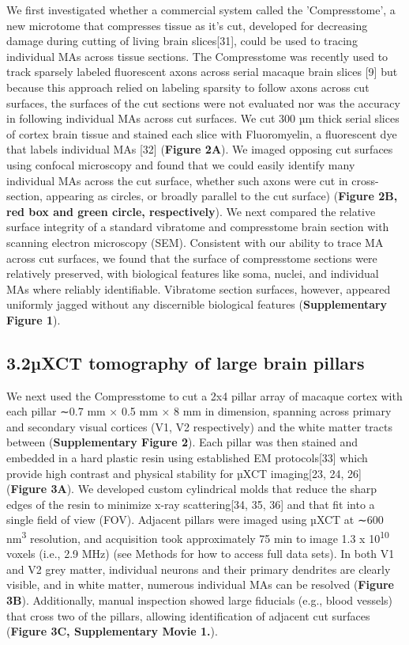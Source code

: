 \documentclass{article}
\begin{document}
We first investigated whether a commercial system called the ’Compresstome’, a new microtome that compresses tissue as it’s cut, developed for decreasing damage during cutting of living brain slices[31], could be used to tracing individual MAs across tissue sections. The Compresstome was recently used to track sparsely labeled fluorescent axons across serial macaque brain slices [9] but because this approach relied on labeling sparsity to follow axons across cut surfaces, the surfaces of the cut sections were not evaluated nor was the accuracy in following individual MAs across cut surfaces. We cut 300 µm thick serial slices of cortex brain tissue and stained each slice with Fluoromyelin, a fluorescent dye that labels individual MAs [32] (\textbf{Figure 2A}). We imaged opposing cut surfaces using confocal microscopy and found that we could easily identify many individual MAs across the cut surface, whether such axons were cut in cross-section, appearing as circles, or broadly parallel to the cut surface) (\textbf{Figure 2B, red box and green circle, respectively}). We next compared the relative surface integrity of a standard vibratome and compresstome brain section with scanning electron microscopy (SEM). Consistent with our ability to trace MA across cut surfaces, we found that the surface of compresstome sections were relatively preserved, with biological features like soma, nuclei, and individual MAs where reliably identifiable. Vibratome section surfaces, however, appeared uniformly jagged without any discernible biological features (\textbf{Supplementary Figure 1}).

\subsection*{3.2\quad µXCT tomography of large brain pillars}

We next used the Compresstome to cut a 2x4 pillar array of macaque cortex with each pillar ∼0.7 mm × 0.5 mm × 8 mm in dimension, spanning across primary and secondary visual cortices (V1, V2 respectively) and the white matter tracts between (\textbf{Supplementary Figure 2}). Each pillar was then stained and embedded in a hard plastic resin using established EM protocols[33] which provide high contrast and physical stability for µXCT imaging[23, 24, 26] (\textbf{Figure 3A}). We developed custom cylindrical molds that reduce the sharp edges of the resin to minimize x-ray scattering[34, 35, 36] and that fit into a single field of view (FOV). Adjacent pillars were imaged using µXCT at ∼600 nm\textsuperscript{3} resolution, and acquisition took approximately 75 min to image 1.3 x 10\textsuperscript{10} voxels (i.e., 2.9 MHz) (see Methods for how to access full data sets). In both V1 and V2 grey matter, individual neurons and their primary dendrites are clearly visible, and in white matter, numerous individual MAs can be resolved (\textbf{Figure 3B}). Additionally, manual inspection showed large fiducials (e.g., blood vessels) that cross two of the pillars, allowing identification of adjacent cut surfaces (\textbf{Figure 3C, Supplementary Movie 1.}).
\end{document}
